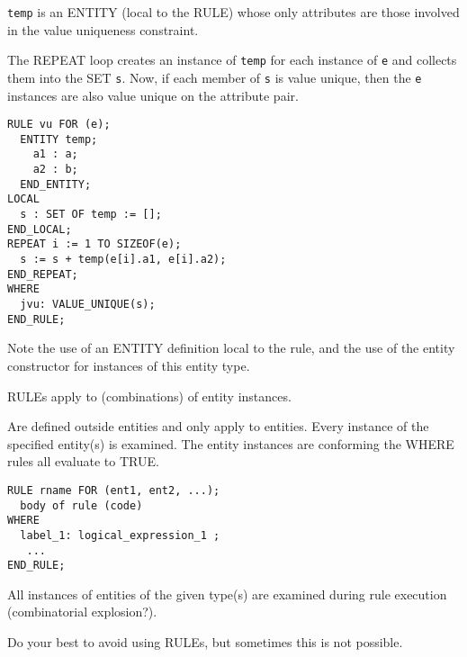\begin{remarks}
\remintro
{}

\texttt{temp} is an ENTITY (local to the RULE) whose only attributes are
those involved in the value uniqueness constraint.

The REPEAT loop creates an instance of \texttt{temp} for each instance
of \texttt{e} and collects them into the SET \texttt{s}. Now, if each
member of \texttt{s} is value unique, then the \texttt{e} instances
are also value unique on the attribute pair.

\remend
\end{remarks}

\clearpage

\begin{verbatim}
RULE vu FOR (e);
  ENTITY temp;
    a1 : a;
    a2 : b;
  END_ENTITY;
LOCAL
  s : SET OF temp := [];
END_LOCAL;
REPEAT i := 1 TO SIZEOF(e);
  s := s + temp(e[i].a1, e[i].a2);
END_REPEAT;
WHERE
  jvu: VALUE_UNIQUE(s);
END_RULE;
\end{verbatim}

    Note the use of an ENTITY definition local to the rule, and the
use of the entity constructor for instances of this entity type.


\begin{remarks}
\remintro
{}

    RULEs apply to (combinations) of entity instances.

\remend
\end{remarks}


    Are defined outside entities and only apply to entities.
Every instance of the specified entity(s) is examined. The
entity instances are conforming the WHERE rules all evaluate to TRUE.

\begin{verbatim}
RULE rname FOR (ent1, ent2, ...);
  body of rule (code)
WHERE
  label_1: logical_expression_1 ;
   ...
END_RULE;
\end{verbatim}

    All instances of entities of the given type(s) are examined during
rule execution (combinatorial explosion?).


\begin{remarks}
\remintro
{}

Do your best to avoid using RULEs, but sometimes this is not possible.

\remend
\end{remarks}

